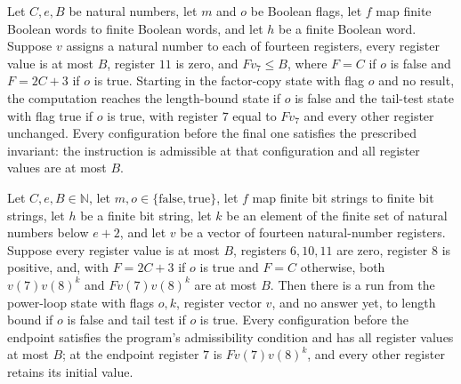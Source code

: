 \begin{lemma}
\label{Complexity.comp_factor_run}
\leanok
{}
Let $C,e,B$ be natural numbers, let $m$ and $o$ be Boolean flags, let $f$ map finite
Boolean words to finite Boolean words, and let $h$ be a finite Boolean word. Suppose $v$
assigns a natural number to each of fourteen registers, every register value is at most
$B$, register $11$ is zero, and $Fv_7\le B$, where $F=C$ if $o$ is false and $F=2C+3$ if
$o$ is true. Starting in the factor-copy state with flag $o$ and no result, the
computation reaches the length-bound state if $o$ is false and the tail-test state with
flag true if $o$ is true, with register $7$ equal to $Fv_7$ and every other register
unchanged. Every configuration before the final one satisfies the prescribed invariant:
the instruction is admissible at that configuration and all register values are at most
$B$.
\end{lemma}

\begin{lemma}
\label{Complexity.comp_power_run}
\leanok
{}
Let $C,e,B\in\mathbb{N}$, let $m,o\in\{\mathrm{false},\mathrm{true}\}$, let $f$ map
finite bit strings to finite bit strings, let $h$ be a finite bit string, let $k$ be an
element of the finite set of natural numbers below $e+2$, and let $v$ be a vector of
fourteen natural-number registers. Suppose every register value is at most $B$,
registers $6,10,11$ are zero, register $8$ is positive, and, with $F=2C+3$ if $o$ is
true and $F=C$ otherwise, both $v(7)v(8)^{k}$ and $Fv(7)v(8)^{k}$ are at most $B$. Then
there is a run from the power-loop state with flags $o,k$, register vector $v$, and no
answer yet, to length bound if $o$ is false and tail test if $o$ is true. Every
configuration before the endpoint satisfies the program's admissibility condition and
has all register values at most $B$; at the endpoint register $7$ is $Fv(7)v(8)^k$, and
every other register retains its initial value.
\end{lemma}

